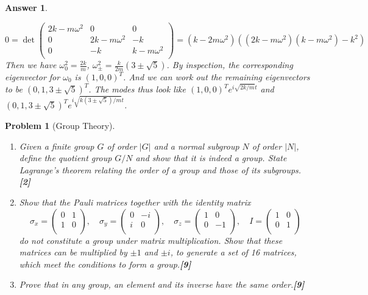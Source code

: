 \documentclass[a4paper]{article}
\newtheorem{ans}{Answer}[section]
\theoremstyle{new}
\newtheorem{qns}{Problem}[section]
\begin{document}
\begin{ans}
\begin{enumerate}[label=(\alph*)]
$$0=\det\begin{pmatrix}2k-m\omega^2&0&0\\0&2k-m\omega^2&-k\\0&-k&k-m\omega^2\\\end{pmatrix}=(k-2m\omega^2)((2k-m\omega^2)(k-m\omega^2)-k^2)$$
Then we have $\omega_0^2=\frac{2k}{m}$, $\omega_\pm^2=\frac{k}{2m}(3\pm\sqrt{5})$. By inspection, the corresponding eigenvector for $\omega_0$ is $(1,0,0)^T$. And we can work out the remaining eigenvectors to be $(0,1,3\pm\sqrt{5})^T$. The modes thus look like $(1,0,0)^Te^{i\sqrt{2k/m}t}$ and $(0,1,3\pm\sqrt{5})^Te^{i\sqrt{k(3\pm\sqrt{5})/m}t}$.
\end{enumerate}
\end{ans}
\newpage
\begin{qns}[Group Theory]\leavevmode
\begin{enumerate}[label=(\alph*)]
\item Given a finite group $G$ of order $|G|$ and a normal subgroup $N$ of order $|N|$, define the quotient group $G/N$ and show that it is indeed a group. State Lagrange’s theorem relating the order of a group and those of its subgroups.\hfill\textbf{[2]}
\item Show that the Pauli matrices together with the identity matrix
$$\sigma_x=\begin{pmatrix}0&1\\1&0\\\end{pmatrix},\quad\sigma_y=\begin{pmatrix}0&-i\\i&0\\\end{pmatrix},\quad\sigma_z=\begin{pmatrix}1&0\\0&-1\\\end{pmatrix},\quad I=\begin{pmatrix}1&0\\0&1\\\end{pmatrix}$$
do not constitute a group under matrix multiplication. Show that these matrices can be multiplied by $\pm 1$ and $\pm i$, to generate a set of 16 matrices, which meet the conditions to form a group.\hfill\textbf{[9]}
\item Prove that in any group, an element and its inverse have the same order.\hfill\textbf{[9]}
\end{enumerate}
\end{qns}
\end{document}
